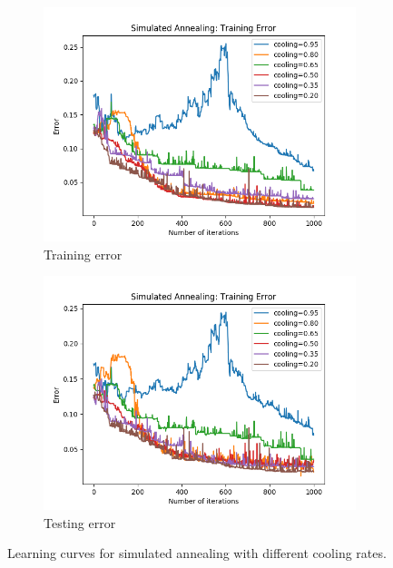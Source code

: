 \documentclass{article}
\begin{document}
  \begin{figure}[htb]
  \centering

  \begin{subfigure}{0.5\textwidth}
    \includegraphics[width=\linewidth]{out/sa/cooling-error-training.png}
    \caption{Training error}
    \label{fig:sa-params-1}
  \end{subfigure}\hfil
  \begin{subfigure}{0.5\textwidth}
    \includegraphics[width=\linewidth]{out/sa/cooling-error-testing.png}
    \caption{Testing error}
    \label{fig:sa-params-2}
  \end{subfigure}

  \caption{Learning curves for simulated annealing with different cooling rates.}
  \label{fig:sa-params}
  \end{figure}
\end{document}

